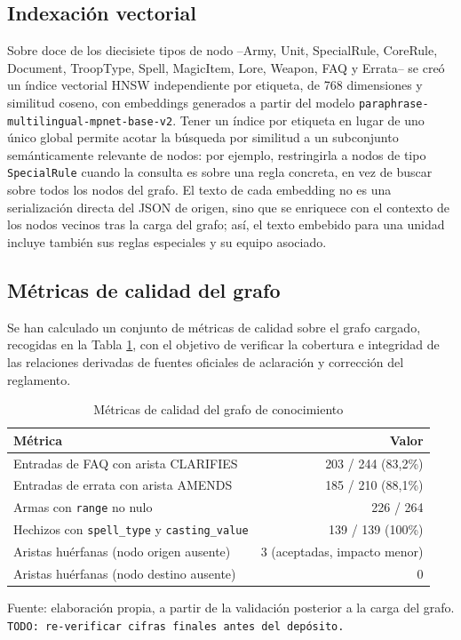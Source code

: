 \documentclass[11pt,a4paper,spanish]{book}
\numberwithin{equation}{chapter}
\numberwithin{figure}{chapter}
\numberwithin{table}{chapter}
\begin{document}
\subsection{Indexación vectorial}

Sobre doce de los diecisiete tipos de nodo --Army, Unit, SpecialRule, CoreRule, Document, TroopType, Spell, MagicItem, Lore, Weapon, FAQ y Errata-- se creó un índice vectorial HNSW independiente por etiqueta, de 768 dimensiones y similitud coseno, con embeddings generados a partir del modelo \texttt{paraphrase-multilingual-mpnet-base-v2}. Tener un índice por etiqueta en lugar de uno único global permite acotar la búsqueda por similitud a un subconjunto semánticamente relevante de nodos: por ejemplo, restringirla a nodos de tipo \texttt{SpecialRule} cuando la consulta es sobre una regla concreta, en vez de buscar sobre todos los nodos del grafo. El texto de cada embedding no es una serialización directa del JSON de origen, sino que se enriquece con el contexto de los nodos vecinos tras la carga del grafo; así, el texto embebido para una unidad incluye también sus reglas especiales y su equipo asociado.

\subsection{Métricas de calidad del grafo}

Se han calculado un conjunto de métricas de calidad sobre el grafo cargado, recogidas en la Tabla \ref{tab:grafo-calidad}, con el objetivo de verificar la cobertura e integridad de las relaciones derivadas de fuentes oficiales de aclaración y corrección del reglamento.

\begin{table}[h]
\centering
\begin{tabular}{|p{7cm}|r|}
	\hline
	\textbf{Métrica} & \textbf{Valor} \\
	\hline
	Entradas de FAQ con arista CLARIFIES & 203 / 244 (83,2\%) \\
	\hline
	Entradas de errata con arista AMENDS & 185 / 210 (88,1\%) \\
	\hline
	Armas con \texttt{range} no nulo & 226 / 264 \\
	\hline
	Hechizos con \texttt{spell\_type} y \texttt{casting\_value} & 139 / 139 (100\%) \\
	\hline
	Aristas huérfanas (nodo origen ausente) & 3 (aceptadas, impacto menor) \\
	\hline
	Aristas huérfanas (nodo destino ausente) & 0 \\
	\hline
\end{tabular}
\caption{Métricas de calidad del grafo de conocimiento}
\label{tab:grafo-calidad}
{\footnotesize\centering Fuente: elaboración propia, a partir de la validación posterior a la carga del grafo. \texttt{TODO: re-verificar cifras finales antes del depósito.}\par}
\end{table}
\end{document}
